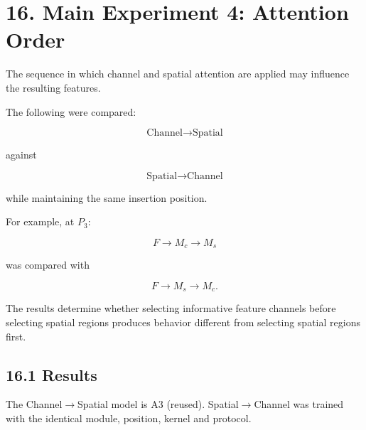 \documentclass[10pt]{article}
\begin{document}
\section*{16. Main Experiment 4: Attention Order}

The sequence in which channel and spatial attention are applied may influence
the resulting features.

The following were compared:

\[
\boxed{
\text{Channel}
\rightarrow
\text{Spatial}
}
\]

against

\[
\boxed{
\text{Spatial}
\rightarrow
\text{Channel}
}
\]

while maintaining the same insertion position.

For example, at $P_3$:

\[
F
\rightarrow
M_c
\rightarrow
M_s
\]

was compared with

\[
F
\rightarrow
M_s
\rightarrow
M_c.
\]

The results determine whether selecting informative feature channels
before selecting spatial regions produces behavior different from selecting
spatial regions first.

\subsection*{16.1 Results}

The Channel$\rightarrow$Spatial model is A3 (reused). Spatial$\rightarrow$Channel was
trained with the identical module, position, kernel and protocol.

\begin{center}
\end{center}
\end{document}

